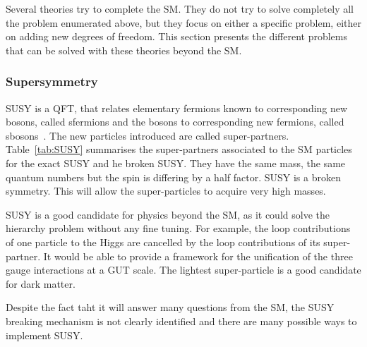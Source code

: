       Several theories try to complete the \gls{SM}. 
      They do not try to solve completely all the problem enumerated above, but they focus on either a specific problem, either on adding new degrees of freedom.
      This section presents the different problems that can be solved with these theories beyond the \gls{SM}.

      \subsubsection{Supersymmetry}
    
      \gls{SUSY} is a \gls{QFT}, that relates elementary fermions known to corresponding new bosons, called sfermions and the bosons to corresponding new fermions, called sbosons~\cite{Signer2009}.
      The new particles introduced are called super-partners.
      Table~\ref{tab:SUSY} summarises the super-partners associated to the \gls{SM} particles for the exact \gls{SUSY} and he broken \gls{SUSY}.
      They have the same mass, the same quantum numbers but the spin is differing by a half factor.
      \gls{SUSY} is a broken symmetry. 
      This will allow the super-particles to acquire very high masses.

      \gls{SUSY} is a good candidate for physics beyond the \gls{SM}, as it could solve the hierarchy problem without any fine tuning.
      For example, the loop contributions of one particle to the Higgs are cancelled by the loop contributions of its super-partner.
      It would be able to provide a framework for the unification of the three gauge interactions at a GUT scale.
      The lightest super-particle is a good candidate for dark matter.

      Despite the fact taht it will answer many questions from the \gls{SM}, the \gls{SUSY} breaking mechanism is not clearly identified and there are many possible ways to implement \gls{SUSY}.
      
